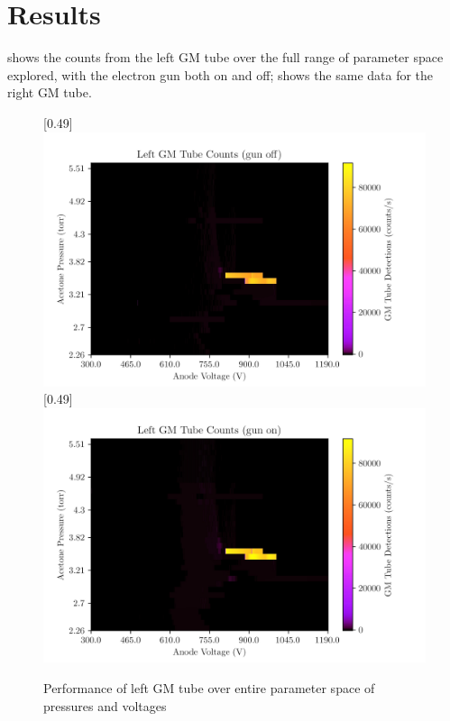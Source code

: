 \section{Results}

 shows the counts from the left GM tube over the full range of parameter space explored, with the electron gun both on and off;  shows the same 
data for the right GM tube. 

\begin{figure}[h!]
    \centering
    [0.49\linewidth]{\includegraphics[scale=0.65]{Figs/LGMGunOff.jpg}}
    [0.49\linewidth]{\includegraphics[scale=0.65]{Figs/LGMGunOn.jpg}}
    \caption{Performance of left GM tube over entire parameter space of pressures and voltages}
    \label{fig:paramLGM}
\end{figure}

